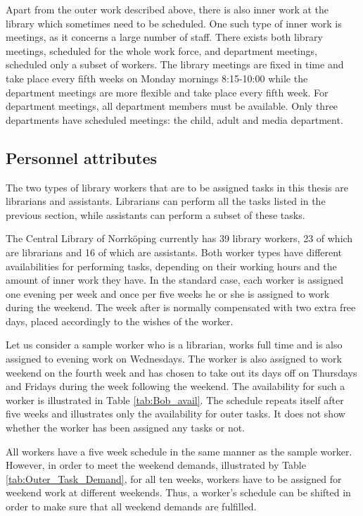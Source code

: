Apart from the outer work described above, there is also inner work at the library which sometimes need to be scheduled. One such type of inner work is meetings, as it concerns a large number of staff. There exists both library meetings, scheduled for the whole work force, and department meetings, scheduled only a subset of workers. The library meetings are fixed in time and take place every fifth weeks on Monday mornings 8:15-10:00 while the department meetings are more flexible and take place every fifth week. For department meetings, all department members must be available. Only three departments have scheduled meetings: the child, adult and media department.

\subsection{Personnel attributes}

The two types of library workers that are to be assigned tasks in this thesis are librarians and assistants. Librarians can perform all the tasks listed in the previous section, while assistants can perform a subset of these tasks.

The Central Library of Norrköping currently has 39 library workers, 23 of which are librarians and 16 of which are assistants. Both worker types have different availabilities for performing tasks, depending on their working hours and the amount of inner work they have. In the standard case, each worker is assigned one evening per week and once per five weeks he or she is assigned to work during the weekend. The week after is normally compensated with two extra free days, placed accordingly to the wishes of the worker.

Let us consider a sample worker who is a librarian, works full time and is also assigned to evening work on Wednesdays. The worker is also assigned to work weekend on the fourth week and has chosen to take out its days off on Thursdays and Fridays during the week following the weekend. The availability for such a worker is illustrated in Table \ref{tab:Bob_avail}. The schedule repeats itself after five weeks and illustrates only the availability for outer tasks. It does not show whether the worker has been assigned any tasks or not.

All workers have a five week schedule in the same manner as the sample worker. However, in order to meet the weekend demands, illustrated by Table \ref{tab:Outer_Task_Demand}, for all ten weeks, workers have to be assigned for weekend work at different weekends. Thus, a worker's schedule can be shifted in order to make sure that all weekend demands are fulfilled.

